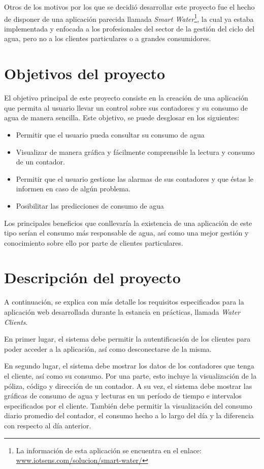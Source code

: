 \documentclass[pdftex,11pt,a4paper]{book}
\begin{document}
Otros de los motivos por los que se decidió desarrollar este proyecto fue el hecho de disponer de una aplicación parecida llamada \textit{Smart Water}\footnote{La información de esta aplicación se encuentra en el enlace: \url{www.iotsens.com/solucion/smart-water/}}, la cual ya estaba implementada y enfocada a los profesionales del sector de la gestión del ciclo del agua, pero no a los clientes particulares o a grandes consumidores.


\section{Objetivos del proyecto} \label{seccion:objetivos}

El objetivo principal de este proyecto consiste en la creación de una aplicación que permita al usuario llevar un control sobre sus contadores y su consumo de agua de manera sencilla. Este objetivo, se puede desglosar en los siguientes:

\begin{itemize}
\item Permitir que el usuario pueda consultar su consumo de agua
\item Visualizar de manera gráfica y fácilmente comprensible la lectura y consumo de un contador.
\item Permitir que el usuario gestione las alarmas de sus contadores y que éstas le informen en caso de algún problema.
\item Posibilitar las predicciones de consumo de agua
\end{itemize}

Los principales beneficios que conllevaría la existencia de una aplicación de este tipo serían el consumo más responsable de agua, así como una mejor gestión y conocimiento sobre ello por parte de clientes particulares.


\section{Descripción del proyecto}

A continuación, se explica con más detalle los requisitos especificados para la aplicación web desarrollada durante la estancia en prácticas, llamada \textit{Water Clients}.

En primer lugar, el sistema debe permitir la autentificación de los clientes para poder acceder a la aplicación, así como desconectarse de la misma.

En segundo lugar, el sistema debe mostrar los datos de los contadores que tenga el cliente, así como su consumo. Por una parte, esto incluye la visualización de la póliza, código y dirección de un contador. A su vez, el sistema debe mostrar las gráficas de consumo de agua y lecturas en un período de tiempo e intervalos especificados por el cliente. También debe permitir la visualización del consumo diario promedio del contador, el consumo hecho a lo largo del día y la diferencia con respecto al día anterior.
\end{document}
